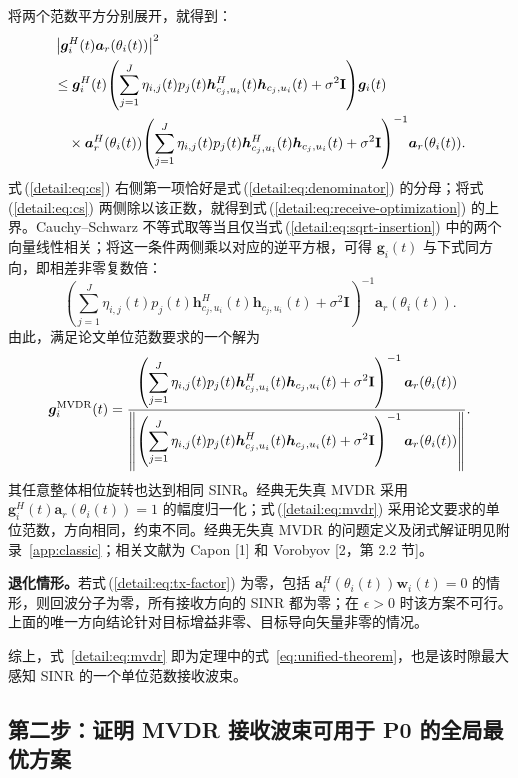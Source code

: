 \documentclass[11pt,a4paper]{ctexart}
\begin{document}
将两个范数平方分别展开，就得到：
\begin{align}
&\left|\bm g_i^H(t)\bm a_r(\theta_i(t))\right|^2\notag\\
&\le\bm g_i^H(t)\!\left(\sum_{j=1}^J\eta_{i,j}(t)p_j(t)
\bm h_{c_j,u_i}^{H}(t)\bm h_{c_j,u_i}(t)+\sigma^2\mathbf I\right)\!\bm g_i(t)\notag\\
&\quad\times\bm a_r^H(\theta_i(t))\!\left(\sum_{j=1}^J\eta_{i,j}(t)p_j(t)
\bm h_{c_j,u_i}^{H}(t)\bm h_{c_j,u_i}(t)+\sigma^2\mathbf I\right)^{-1}\!\bm a_r(\theta_i(t)).\label{detail:eq:cs}
\end{align}
式\,(\ref{detail:eq:cs}) 右侧第一项恰好是式\,(\ref{detail:eq:denominator}) 的分母；将式\,(\ref{detail:eq:cs}) 两侧除以该正数，就得到式\,(\ref{detail:eq:receive-optimization}) 的上界。Cauchy--Schwarz 不等式取等当且仅当式\,(\ref{detail:eq:sqrt-insertion}) 中的两个向量线性相关；将这一条件两侧乘以对应的逆平方根，可得 $\bm g_i(t)$ 与下式同方向，即相差非零复数倍：
\begin{equation}\label{detail:eq:direction}
\left(\sum_{j=1}^J\eta_{i,j}(t)p_j(t)
\bm h_{c_j,u_i}^{H}(t)\bm h_{c_j,u_i}(t)+\sigma^2\mathbf I\right)^{-1}
\bm a_r(\theta_i(t)).
\end{equation}
由此，满足论文单位范数要求的一个解为
\begin{equation}\label{detail:eq:mvdr}
\bm g_i^{\rm MVDR}(t)=
\frac{\left(\displaystyle\sum_{j=1}^J\eta_{i,j}(t)p_j(t)
\bm h_{c_j,u_i}^{H}(t)\bm h_{c_j,u_i}(t)+\sigma^2\mathbf I\right)^{-1}
\bm a_r(\theta_i(t))}
{\left\|\left(\displaystyle\sum_{j=1}^J\eta_{i,j}(t)p_j(t)
\bm h_{c_j,u_i}^{H}(t)\bm h_{c_j,u_i}(t)+\sigma^2\mathbf I\right)^{-1}
\bm a_r(\theta_i(t))\right\|}.
\end{equation}
其任意整体相位旋转也达到相同 SINR。经典无失真 MVDR 采用 $\bm g_i^H(t)\bm a_r(\theta_i(t))=1$ 的幅度归一化；式\,(\ref{detail:eq:mvdr}) 采用论文要求的单位范数，方向相同，约束不同。经典无失真 MVDR 的问题定义及闭式解证明见附录~\ref{app:classic}；相关文献为 Capon [1] 和 Vorobyov [2，第 2.2 节]。

\textbf{退化情形。}若式\,(\ref{detail:eq:tx-factor}) 为零，包括 $\bm a_t^H(\theta_i(t))\bm w_i(t)=0$ 的情形，则回波分子为零，所有接收方向的 SINR 都为零；在 $\epsilon>0$ 时该方案不可行。上面的唯一方向结论针对目标增益非零、目标导向矢量非零的情况。


综上，式~\eqref{detail:eq:mvdr} 即为定理中的式~\eqref{eq:unified-theorem}，也是该时隙最大感知 SINR 的一个单位范数接收波束。



\subsection{第二步：证明 MVDR 接收波束可用于 P0 的全局最优方案}
\end{document}
